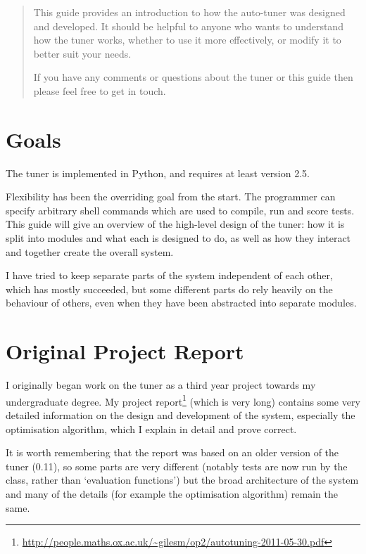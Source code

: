 \documentclass[a4paper, draft]{article}
\begin{document}
\maketitle

\begin{abstract}
This guide provides an introduction to how the auto-tuner was designed and 
developed. It should be helpful to anyone who wants to understand how the 
tuner works, whether to use it more effectively, or modify it to better suit 
your needs.

If you have any comments or questions about the tuner or this guide then
please feel free to get in touch.
\end{abstract}

\tableofcontents



\section{Goals}
The tuner is implemented in Python, and requires at least version 2.5.

Flexibility has been the overriding goal from the start. The programmer can 
specify arbitrary shell commands which are used to compile, run and score 
tests. This guide will give an overview of the high-level design of the tuner: 
how it is split into modules and what each is designed to do, as well as how 
they interact and together create the overall system. 

I have tried to keep separate parts of the system independent of each other, 
which has mostly succeeded, but some different parts do rely heavily on the 
behaviour of others, even when they have been abstracted into separate modules.




\clearpage

\section{Original Project Report}
I originally began work on the tuner as a third year project towards my 
undergraduate degree. My project 
report\footnote{\url{http://people.maths.ox.ac.uk/~gilesm/op2/autotuning-2011-05-30.pdf}} 
(which is very long) contains some very detailed information on the design and 
development of the system, especially the optimisation algorithm, which I 
explain in detail and prove correct. 

It is worth remembering that the report was based 
on an older version of the tuner (0.11), so some parts are very different 
(notably tests are now run by the  class, rather than 
`evaluation functions') but the broad architecture of the system and many of 
the details (for example the optimisation algorithm) remain the same.
\end{document}

